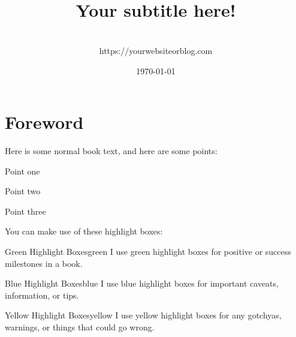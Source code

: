 \documentclass[a4paper,headinclude=on,footinclude=on,12pt,oneside]{scrbook}
\begin{document}
\title{\\\small{Your subtitle here!}}
\author{
    \\https://yourwebsiteorblog.com
}
\date{\today}

\maketitle
\tableofcontents

\listoffigures
{}

\listoflistings
{}

\chapter*{Foreword}


Here is some normal book text, and here are some points:

\begin{arrows}
\item Point one
\item Point two
\item Point three
\end{arrows}


You can make use of these highlight boxes:

\begin{highlightBox}{Green Highlight Boxes}{green}{\greenCheck}
I use green highlight boxes for positive or success milestones in a book.
\end{highlightBox}

\begin{highlightBox}{Blue Highlight Boxes}{blue}{\information}
I use blue highlight boxes for important caveats, information, or tips.
\end{highlightBox}

\begin{highlightBox}{Yellow Highlight Boxes}{yellow}{\warning}
I use yellow highlight boxes for any gotchyas, warnings, or things that could go wrong.
\end{highlightBox}
\end{document}
